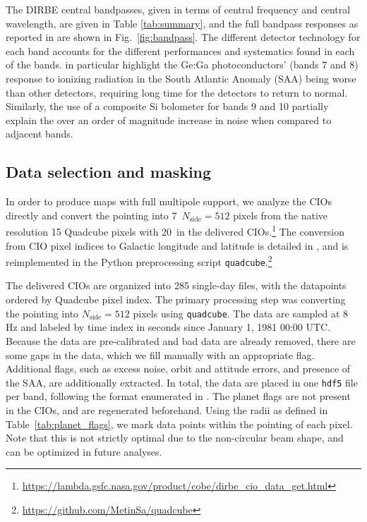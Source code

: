 \documentclass{aa}
\begin{document}
The DIRBE central bandpasses, given in terms of central frequency and central wavelength, are given in Table \ref{tab:summary}, and the full bandpass responses as reported in \citet{cobe_exsupp} are shown in Fig.~\ref{fig:bandpass}.
The different detector technology for each band accounts for the different performances and systematics found in each of the bands. \citet{silverberg93} in particular highlight the Ge:Ga photoconductors' (bands 7 and 8) response to ionizing radiation in the South Atlantic Anomaly (SAA) being worse than other detectors, requiring long time for the detectors to return to normal. Similarly, the use of a composite Si bolometer for bands 9 and 10 partially explain the over an order of magnitude increase in noise when compared to adjacent bands.

\subsection{Data selection and masking}
\label{sec:data_selection}

In order to produce maps with full multipole support, we analyze the CIOs directly and convert the pointing into 7\arcm\  $N_\mathrm{side}=512$ pixels from the native resolution 15 Quadcube pixels with 20\arcs\ in the delivered CIOs.\footnote{\url{https://lambda.gsfc.nasa.gov/product/cobe/dirbe\_cio\_data\_get.html}} The conversion from CIO pixel indices to Galactic longitude and latitude is detailed in \citet{cobe_exsupp}, and is reimplemented in the Python preprocessing script \texttt{quadcube}.\footnote{\url{https://github.com/MetinSa/quadcube}}

The delivered CIOs are organized into 285 single-day files, with the datapoints ordered by Quadcube pixel index. The primary processing step was converting the pointing into $N_\mathrm{side}=512$ pixels using \texttt{quadcube}. The data are sampled at 8\,Hz and labeled by time index in seconds since January 1, 1981 00:00 UTC. Because the data are pre-calibrated and bad data are already removed, there are some gaps in the data, which we fill manually with an appropriate flag. Additional flags, such as excess noise, orbit and attitude errors, and presence of the SAA, are additionally extracted. In total, the data are placed in one \texttt{hdf5} file per band, following the format enumerated in \citet{bp03}.
The planet flags are not present in the CIOs, and are regenerated beforehand. Using the radii as defined in Table~\ref{tab:planet_flags}, we mark data points within the pointing of each pixel. Note that this is not strictly optimal due to the non-circular beam shape, and can be optimized in future analyses.
\end{document}
